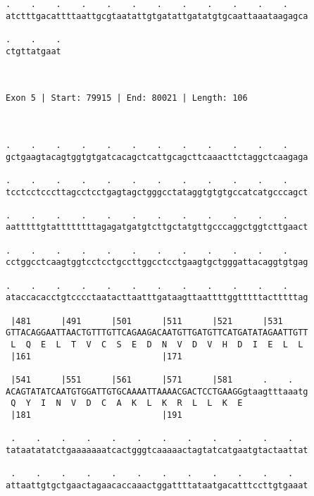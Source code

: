 \documentclass{article}
\begin{document}
\begin{Verbatim}
.    .    .    .    .    .    .    .    .    .    .    .    
atctttgacattttaattgcgtaatattgtgatattgatatgtgcaattaaataagagca
                                                            
.    .    .
ctgttatgaat
           
           
 
Exon 5 | Start: 79915 | End: 80021 | Length: 106



.    .    .    .    .    .    .    .    .    .    .    .    
gctgaagtacagtggtgtgatcacagctcattgcagcttcaaacttctaggctcaagaga
                                                            
.    .    .    .    .    .    .    .    .    .    .    .    
tcctcctcccttagcctcctgagtagctgggcctataggtgtgtgccatcatgcccagct
                                                            
.    .    .    .    .    .    .    .    .    .    .    .    
aatttttgtattttttttagagatgatgtcttgctatgttgcccaggctggtcttgaact
                                                            
.    .    .    .    .    .    .    .    .    .    .    .    
cctggcctcaagtggtcctcctgccttggcctcctgaagtgctgggattacaggtgtgag
                                                            
.    .    .    .    .    .    .    .    .    .    .    .    
ataccacacctgtcccctaatacttaatttgataagttaattttggtttttactttttag
                                                            
 |481      |491      |501      |511      |521      |531     
GTTACAGGAATTAACTGTTTGTTCAGAAGACAATGTTGATGTTCATGATATAGAATTGTT
 L  Q  E  L  T  V  C  S  E  D  N  V  D  V  H  D  I  E  L  L 
 |161                          |171                         
  
 |541      |551      |561      |571      |581      .    .   
ACAGTATATCAATGTGGATTGTGCAAAATTAAAACGACTCCTGAAGGgtaagtttaaatg
 Q  Y  I  N  V  D  C  A  K  L  K  R  L  L  K  E             
 |181                          |191                         
  
 .    .    .    .    .    .    .    .    .    .    .    .   
tataatatatctgaaaaaaatcactgggtcaaaaactagtatcatgaatgtactaattat
                                                            
 .    .    .    .    .    .    .    .    .    .    .    .   
attaattgtgctgaactagaacaccaaactggattttataatgacatttccttgtgaaat
                                                            

\end{Verbatim}
\end{document}
